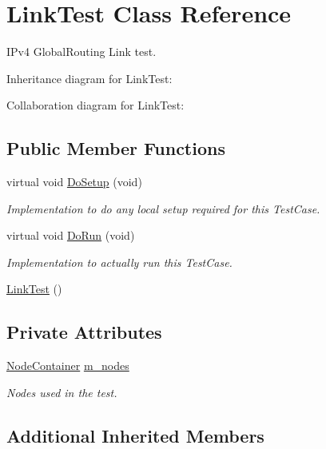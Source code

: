 \hypertarget{classLinkTest}{}\section{Link\+Test Class Reference}
\label{classLinkTest}


I\+Pv4 Global\+Routing Link test.  




Inheritance diagram for Link\+Test\+:


Collaboration diagram for Link\+Test\+:
\subsection*{Public Member Functions}
\begin{DoxyCompactItemize}
\item 
virtual void \hyperlink{classLinkTest_a1f2bbaa1530ec0c0e18fab0a3d8dc73e}{Do\+Setup} (void)
\begin{DoxyCompactList}\small\item\em Implementation to do any local setup required for this Test\+Case. \end{DoxyCompactList}\item 
virtual void \hyperlink{classLinkTest_a9b5e4d683f5baee1e25d1f46395be2e0}{Do\+Run} (void)
\begin{DoxyCompactList}\small\item\em Implementation to actually run this Test\+Case. \end{DoxyCompactList}\item 
\hyperlink{classLinkTest_a2888053b5f475166040a26dc70d2b2dd}{Link\+Test} ()
\end{DoxyCompactItemize}
\subsection*{Private Attributes}
\begin{DoxyCompactItemize}
\item 
\hyperlink{classns3_1_1NodeContainer}{Node\+Container} \hyperlink{classLinkTest_a5a290d414e995ec402de538a24976387}{m\+\_\+nodes}
\begin{DoxyCompactList}\small\item\em Nodes used in the test. \end{DoxyCompactList}\end{DoxyCompactItemize}
\subsection*{Additional Inherited Members}



